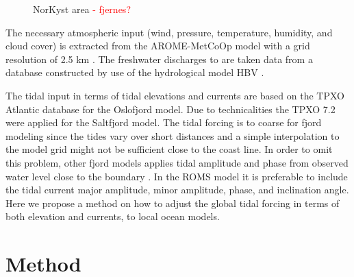 

\begin{figure}[!t]
\centering
\caption{NorKyst area \textcolor{Red}{- fjernes?}}
\label{fig:NorKyst}
\end{figure}

The necessary atmospheric input (wind, pressure, temperature, humidity, and cloud cover) is extracted from the AROME-MetCoOp model with a grid resolution of 2.5 km \cite[]{muller2015}. The freshwater discharges to are taken data from a database constructed by use of the hydrological model HBV \cite[]{beldring2003}.

The tidal input in terms of tidal elevations and currents are based on the TPXO Atlantic database \cite[]{egbert02} for the Oslofjord model. Due to technicalities the TPXO 7.2 were applied for the Saltfjord model. The tidal forcing is to coarse for fjord modeling since the tides vary over short distances and a simple interpolation to the model grid might not be sufficient close to the coast line. In order to omit this problem, other fjord models applies tidal amplitude and phase from observed water level close to the boundary \cite[i.e.]{svendsen96,lynge13}. In the ROMS model it is preferable to include the tidal current major amplitude, minor amplitude, phase, and inclination angle. Here we propose a method on how to adjust the global tidal forcing in terms of both elevation and currents, to local ocean models. 

\section{Method}

